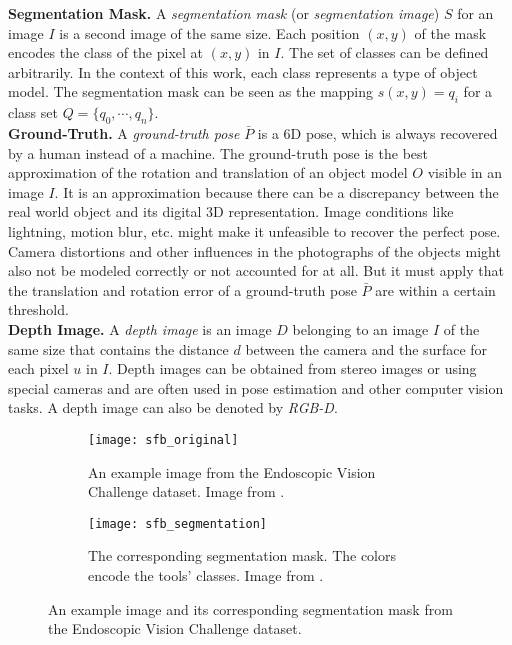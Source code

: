 \noindent\textbf{Segmentation Mask.} A \textit{segmentation mask} (or \textit{segmentation image}) $S$ for an image $I$ is a second image of the same size. Each position $(x, y)$ of the mask encodes the class of the pixel at $(x, y)$ in $I$. The set of classes can be defined arbitrarily. In the context of this work, each class represents a type of object model. The segmentation mask can be seen as the mapping $s(x, y) = q_i$ for a class set $Q = \{q_0, \cdots, q_n\}$. \\

\noindent\textbf{Ground-Truth.} A \textit{ground-truth pose} $\bar{P}$ is a 6D pose, which is always recovered by a human instead of a machine. The ground-truth pose is the best approximation of the rotation and translation of an object model $O$ visible in an image $I$. It is an approximation because there can be a discrepancy between the real world object and its digital 3D representation. Image conditions like lightning, motion blur, etc. might make it unfeasible to recover the perfect pose. Camera distortions and other influences in the photographs of the objects might also not be modeled correctly or not accounted for at all. But it must apply that the translation and rotation error of a ground-truth pose $\bar{P}$ are within a certain threshold. \\

\noindent\textbf{Depth Image.} A \textit{depth image} is an image $D$ belonging to an image $I$ of the same size that contains the distance $d$ between the camera and the surface for each pixel $u$ in $I$. Depth images can be obtained from stereo images or using special cameras and are often used in pose estimation and other computer vision tasks. A depth image can also be denoted by \textit{RGB-D}.

\begin{figure}[!tbp]
	\centering
	\begin{subfigure}[t]{0.47\textwidth}
	\centering
    	\texttt{[image: sfb\_original]}
    	\caption{An example image from the Endoscopic Vision Challenge dataset. Image from \cite{endovis}.}
    	\label{fig:sfb_original}
	\end{subfigure}
	\hfill
	\begin{subfigure}[t]{0.47\textwidth}
	\centering
    	\texttt{[image: sfb\_segmentation]}
    	\caption{The corresponding segmentation mask. The colors encode the tools' classes. Image from \cite{endovis}.}
    	\label{fig:sfb_segmentation}
	\end{subfigure}
	\caption{An example image and its corresponding segmentation mask from the Endoscopic Vision Challenge dataset.}
	\label{fig:sfb}
\end{figure} 

